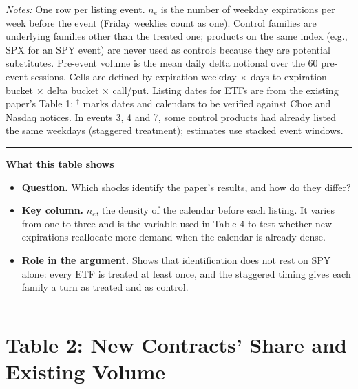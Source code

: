 \documentclass[11pt]{article}
\newenvironment{tableshows}
  {\begin{center}\begin{minipage}{0.95\textwidth}\small
   \hrule\vspace{4pt}
   \textbf{What this table shows}\par
   \begin{itemize}[leftmargin=12pt,topsep=4pt,itemsep=4pt,parsep=0pt]}
  {\end{itemize}\vspace{2pt}\hrule\end{minipage}\end{center}}
\begin{document}
\begin{table}[H]
\begin{threeparttable}
\begin{tablenotes}
\item[] \textit{Notes:} One row per listing event. $n_e$ is the number of weekday expirations per week before the event (Friday weeklies count as one). Control families are underlying families other than the treated one; products on the same index (e.g., SPX for an SPY event) are never used as controls because they are potential substitutes. Pre-event volume is the mean daily delta notional over the 60 pre-event sessions. Cells are defined by expiration weekday $\times$ days-to-expiration bucket $\times$ delta bucket $\times$ call/put. Listing dates for ETFs are from the existing paper's Table 1; $^\dagger$ marks dates and calendars to be verified against Cboe and Nasdaq notices. In events 3, 4 and 7, some control products had already listed the same weekdays (staggered treatment); estimates use stacked event windows.
\end{tablenotes}
\end{threeparttable}
\end{table}

\begin{tableshows}
\item \textbf{Question.} Which shocks identify the paper's results, and how do they differ?
\item \textbf{Key column.} $n_e$, the density of the calendar before each listing. It varies from one to three and is the variable used in Table 4 to test whether new expirations reallocate more demand when the calendar is already dense.
\item \textbf{Role in the argument.} Shows that identification does not rest on SPY alone: every ETF is treated at least once, and the staggered timing gives each family a turn as treated and as control.
\end{tableshows}

\clearpage
\section*{Table 2: New Contracts' Share and Existing Volume}
\end{document}
